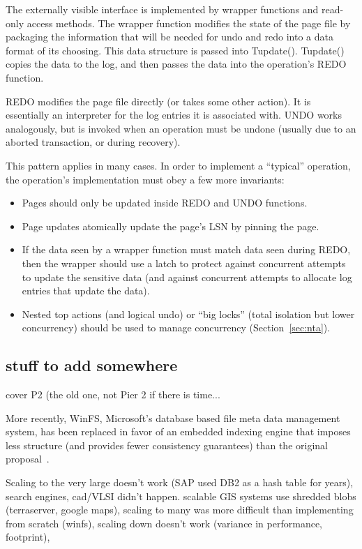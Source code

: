 \documentclass[letterpaper,twocolumn,10pt]{article}
\begin{document}
{The externally visible interface is implemented by wrapper functions
and read-only access methods.  The wrapper function modifies the state
of the page file by packaging the information that will be needed for
undo and redo into a data format of its choosing.  This data structure
is passed into Tupdate().  Tupdate() copies the data to the log, and
then passes the data into the operation's REDO function.
 
REDO modifies the page file directly (or takes some other action).  It
is essentially an interpreter for the log entries it is associated
with.  UNDO works analogously, but is invoked when an operation must
be undone (usually due to an aborted transaction, or during recovery).

This pattern applies in many cases.  In
order to implement a ``typical'' operation, the operation's
implementation must obey a few more invariants:

\begin{itemize}
\item Pages should only be updated inside REDO and UNDO functions.
\item Page updates atomically update the page's LSN by pinning the page.
\item If the data seen by a wrapper function must match data seen
  during REDO, then the wrapper should use a latch to protect against
  concurrent attempts to update the sensitive data (and against
  concurrent attempts to allocate log entries that update the data).
\item Nested top actions (and logical undo) or ``big locks'' (total isolation but lower concurrency) should be used to manage concurrency (Section~\ref{sec:nta}).
\end{itemize}
}

\subsection{stuff to add somewhere}

cover P2 (the old one, not Pier 2 if there is time...

More recently, WinFS, Microsoft's database based
file meta data management system, has been replaced in favor of an
embedded indexing engine that imposes less structure (and provides
fewer consistency guarantees) than the original
proposal~\cite{needtocitesomething}.

Scaling to the very large doesn't work (SAP used DB2 as a hash table
for years), search engines, cad/VLSI didn't happen.  scalable GIS
systems use shredded blobs (terraserver, google maps), scaling to many
was more difficult than implementing from scratch (winfs), scaling
down doesn't work (variance in performance, footprint),
\end{document}
